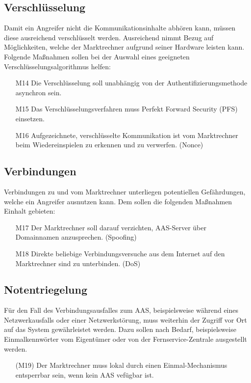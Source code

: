 \documentclass[11pt,a4paper]{report}
\begin{document}
\subsection{Verschlüsselung}
Damit ein Angreifer nicht die Kommunikationsinhalte abhören kann, müssen diese ausreichend verschlüsselt werden. Ausreichend nimmt Bezug auf Möglichkeiten, welche der Marktrechner aufgrund seiner Hardware leisten kann. Folgende Maßnahmen sollen bei der Auswahl eines geeigneten Verschlüsselungsalgorithmus helfen:

\begin{enumerate}
\item[M14] Die Verschlüsselung soll unabhängig von der Authentifizierungsmethode asynchron sein.
\item[M15] Das Verschlüsselungsverfahren muss Perfekt Forward Security (PFS) einsetzen.
\item[M16] Aufgezeichnete, verschlüsselte Kommunikation ist vom Marktrechner beim Wiedereinspielen zu erkennen und zu verwerfen. (Nonce)
\end{enumerate}

\subsection{Verbindungen}
Verbindungen zu und vom Marktrechner unterliegen potentiellen Gefährdungen, welche ein Angreifer ausnutzen kann. Dem sollen die folgenden Maßnahmen Einhalt gebieten:

\begin{enumerate}
\item[M17] Der Marktrechner soll darauf verzichten, AAS-Server über Domainnamen anzusprechen. (Spoofing)
\item[M18] Direkte beliebige Verbindungsversuche aus dem Internet auf den Marktrechner sind zu unterbinden. (DoS)
\end{enumerate}

\subsection{Notentriegelung}
Für den Fall des Verbindungsausfalles zum AAS, beispielsweise während eines Netzwerkausfalls oder einer Netzwerkstörung, muss weiterhin der Zugriff vor Ort auf das System gewährleistet werden. Dazu sollen nach Bedarf, beispielsweise Einmalkennwörter vom Eigentümer oder von der Fernservice-Zentrale ausgestellt werden.

\begin{enumerate}
\item[(M19)] Der Marktrechner muss lokal durch einen Einmal-Mechanismus entsperrbar sein, wenn kein AAS vefügbar ist.
\end{enumerate}
\end{document}
